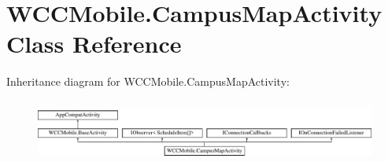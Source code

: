 \hypertarget{class_w_c_c_mobile_1_1_campus_map_activity}{}\section{W\+C\+C\+Mobile.\+Campus\+Map\+Activity Class Reference}
\label{class_w_c_c_mobile_1_1_campus_map_activity}
Inheritance diagram for W\+C\+C\+Mobile.\+Campus\+Map\+Activity\+:\begin{figure}[H]
\begin{center}
\leavevmode
\includegraphics[height=2.068965cm]{class_w_c_c_mobile_1_1_campus_map_activity}
\end{center}
\end{figure}
